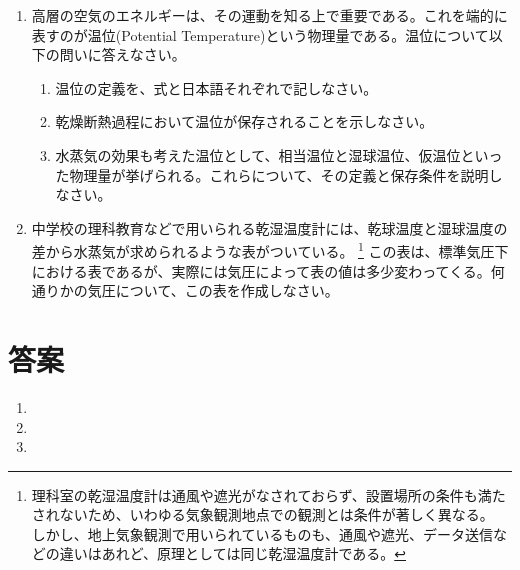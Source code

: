 \documentclass{jsarticle}
\newenvironment{problems}
{
  \renewcommand\labelenumi{\doublebox{\arabic{enumi}}}
  \begin{enumerate}
}{
  \end{enumerate}
  \renewcommand\labelenumi{\arabic{enumi}.}
}
\begin{document}
\begin{problems}
        \begin{enumerate}[(1)]
        \item 文中の空欄(A)〜(J)に当てはまる語句や数値を答えなさい。
        \item 下線部(a)について、理想気体の状態方程式から、(A)の状態方程式を導出しなさい。
        \item 下線部(b)について、気柱の釣り合いから(B)を導出しなさい。
        \item (A),(B)を用い、等温大気における気圧$p$の高度$z$を求めなさい。
        \item 高度$z$で観測した気圧が$p$、気温が$T$であった。この時、この観測地点の$T$を海面補正した値を求めなさい。
        \item 高層天気図で用いられる気圧面(指定気圧面)の代表的な気圧は、300hPa,500hPa,700hPa,850hPaである。これらの気圧面が概ねどの程度の高度に対応するか答えなさい。
        \item 下線部(c)について、(H)を求めるには、通常どのような式を用いるか、2例程度、名前と式を挙げなさい。\\
        \end{enumerate}

    \item 高層の空気のエネルギーは、その運動を知る上で重要である。これを端的に表すのが温位(Potential Temperature)という物理量である。温位について以下の問いに答えなさい。
        \begin{enumerate}[(1)]
        \item 温位の定義を、式と日本語それぞれで記しなさい。
        \item 乾燥断熱過程において温位が保存されることを示しなさい。
        \item 水蒸気の効果も考えた温位として、相当温位と湿球温位、仮温位といった物理量が挙げられる。これらについて、その定義と保存条件を説明しなさい。\\
        \end{enumerate}

    \item 中学校の理科教育などで用いられる乾湿温度計には、乾球温度と湿球温度の差から水蒸気が求められるような表がついている。
        \footnote{理科室の乾湿温度計は通風や遮光がなされておらず、設置場所の条件も満たされないため、いわゆる気象観測地点での観測とは条件が著しく異なる。
                しかし、地上気象観測で用いられているものも、通風や遮光、データ送信などの違いはあれど、原理としては同じ乾湿温度計である。}
        この表は、標準気圧下における表であるが、実際には気圧によって表の値は多少変わってくる。何通りかの気圧について、この表を作成しなさい。\\
\end{problems}

\section{答案}
\begin{problems}
\item 

\item 

\item 

\end{problems}
\end{document}
